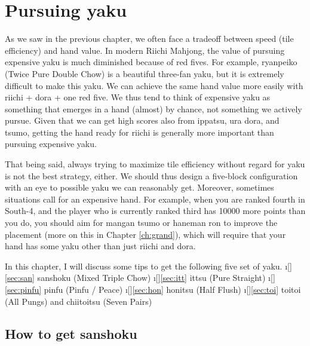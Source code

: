 
\chapter{Pursuing {\jap yaku}} \label{ch:yaku}
\thispagestyle{fancy}

\bigskip
As we saw in the previous chapter, we often face a tradeoff between speed (tile efficiency) and hand value. In modern Riichi Mahjong, the value of pursuing expensive {\jap yaku} is much diminished because of red fives. 
For example, {\jap ryanpeiko} (Twice Pure Double Chow) is a beautiful three-{\jap fan yaku}, but it is extremely difficult to make this {\jap yaku}. We can achieve the same hand value more easily with {\jap riichi} + {\jap dora} + one red five. We thus tend to think of expensive {\jap yaku} as something that emerges in a hand (almost) by chance, not something we actively pursue. 
Given that we can get high scores also from {\jap ippatsu}, {\jap ura dora}, and {\jap tsumo}, getting the hand ready for {\jap riichi} is generally more important than pursuing expensive {\jap yaku}. 

\bigskip
That being said, always trying to maximize tile efficiency without regard for {\jap yaku} is not the best strategy, either. We should thus design a five-block configuration with an eye to possible {\jap yaku} we can reasonably get. Moreover, sometimes situations call for an expensive hand. For example, when you are ranked fourth in South-4, and the player who is currently ranked third has 10000 more points than you do, you should aim for {\jap mangan tsumo} or {\jap haneman ron} to improve the placement (more on this in Chapter \ref{ch:grand}), which will require that your hand has some {\jap yaku} other than just {\jap riichi} and {\jap dora}. 

\bigskip
In this chapter, I will discuss some tips to get the following five set of {\jap yaku}. 
\bi
\i[]\ref{sec:san} {\jap sanshoku} (Mixed Triple Chow)
\i[]\ref{sec:itt} {\jap ittsu} (Pure Straight)
\i[]\ref{sec:pinfu} {\jap pinfu} (Pinfu / Peace)
\i[]\ref{sec:hon} {\jap honitsu} (Half Flush)
\i[]\ref{sec:toi} {\jap toitoi} (All Pungs) and {\jap chiitoitsu} (Seven Pairs)
\ei

\newpage
\section{How to get {\jap sanshoku}}  \label{sec:san}

